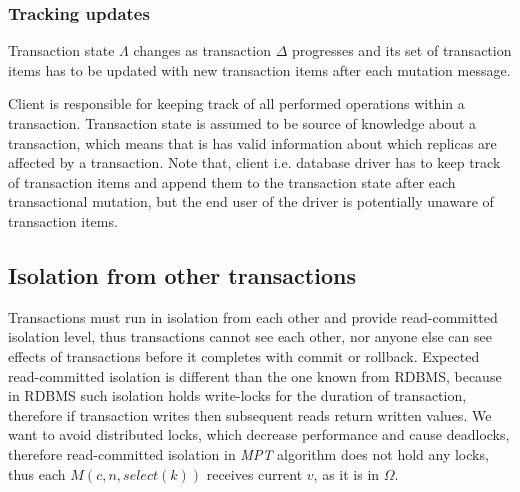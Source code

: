 \documentclass[runningheads,a4paper]{llncs}
\newcommand{\transaction}{$\Delta$\xspace}
\newcommand{\beginTransactionMessage}{$\mathit{M}(c, n, \mathit{begin\_transaction}())$\xspace}
\newcommand{\initialTxStateMessage}{$\mathit{M}(n, c, \mathit{initial\_transaction\_state}(\Lambda_{0}))$\xspace}
\newcommand{\selectMessage}{$\mathit{M}(c,n,select(k))$\xspace}
\newcommand{\database}{$\Omega$\xspace}
\newcommand{\txState}{$\Lambda$\xspace}
\newcommand{\mpt}{\emph{MPT}\xspace}
\begin{document}
\subsubsection{Tracking updates}
Transaction state \txState changes as transaction \transaction progresses and its set of transaction items has to be updated with new transaction items after each mutation message. 



Client is responsible for keeping track of all performed operations within a transaction. Transaction state is assumed to be source of knowledge about a transaction, which means that is has valid information about which replicas are affected by a transaction.
Note that, client i.e. database driver has to keep track of transaction items and append them to the transaction state after each transactional mutation, but the end user of the driver is potentially unaware of transaction items.

\subsection{Isolation from other transactions}
Transactions must run in isolation from each other and provide read-committed isolation level, thus transactions cannot see each other, nor anyone else can see effects of transactions before it completes with commit or rollback. Expected read-committed isolation is different than the one known from RDBMS, because in RDBMS such isolation holds write-locks for the duration of transaction, therefore if transaction writes then subsequent reads return written values. We want to avoid distributed locks, which decrease performance and cause deadlocks, therefore read-committed isolation in \mpt algorithm does not hold any locks, thus each \selectMessage receives current $v$, as it is in \database.
\end{document}

